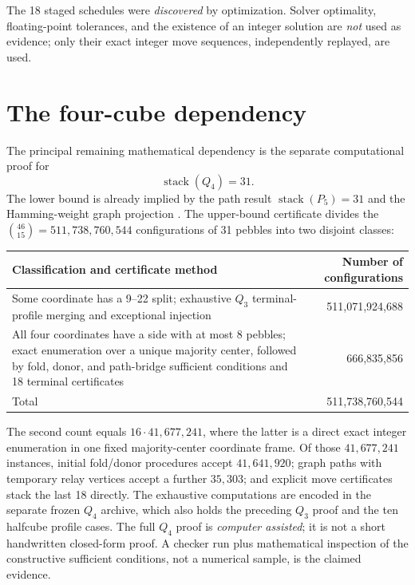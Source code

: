 \documentclass[11pt,a4paper]{article}
\newcommand{\stack}{\operatorname{stack}}
\begin{document}
The 18 staged schedules were \emph{discovered} by optimization. Solver optimality, floating-point tolerances, and the existence of an integer solution are \emph{not} used as evidence; only their exact integer move sequences, independently replayed, are used.

\section{The four-cube dependency}\label{sec:q4}
The principal remaining mathematical dependency is the separate computational proof for
\[
\stack(Q_4)=31.\tag{2}
\]
The lower bound is already implied by the path result $\stack(P_5)=31$ and the Hamming-weight graph projection \cite{CS2026}. The upper-bound certificate divides the $\binom{46}{15}=511{,}738{,}760{,}544$ configurations of 31 pebbles into two disjoint classes:
\begin{center}\small
\begin{tabularx}{\linewidth}{Xr}
\toprule
Classification and certificate method & Number of configurations\\\midrule
Some coordinate has a 9--22 split; exhaustive $Q_3$ terminal-profile merging and exceptional injection & 511,071,924,688\\
All four coordinates have a side with at most 8 pebbles; exact enumeration over a unique majority center, followed by fold, donor, and path-bridge sufficient conditions and 18 terminal certificates & 666,835,856\\\midrule
Total & 511,738,760,544\\\bottomrule
\end{tabularx}
\end{center}

The second count equals $16\cdot41{,}677{,}241$, where the latter is a direct exact integer enumeration in one fixed majority-center coordinate frame. Of those $41{,}677{,}241$ instances, initial fold/donor procedures accept $41{,}641{,}920$; graph paths with temporary relay vertices accept a further $35{,}303$; and explicit move certificates stack the last 18 directly. The exhaustive computations are encoded in the separate frozen $Q_4$ archive, which also holds the preceding $Q_3$ proof and the ten halfcube profile cases. The full $Q_4$ proof is \emph{computer assisted}; it is not a short handwritten closed-form proof. A checker run plus mathematical inspection of the constructive sufficient conditions, not a numerical sample, is the claimed evidence.
\end{document}
